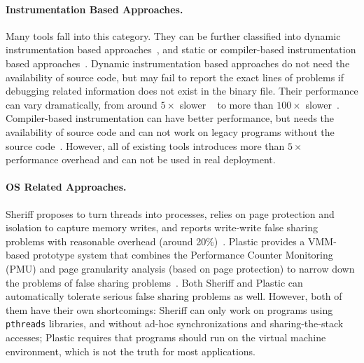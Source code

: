 \paragraph{Instrumentation Based Approaches.} Many tools fall into this category. They can be further classified into dynamic instrumentation based approaches~\cite{falseshare:binaryinstrumentation1, falseshare:binaryinstrumentation2, qinzhao}, and static or compiler-based instrumentation based approaches~\cite{Predator}. Dynamic instrumentation based approaches do not need the availability of source code, but may fail to report the exact lines of problems if debugging related information does not exist in the binary file. Their performance can vary dramatically, from around $5\times$ slower ~\cite{qinzhao} to more than $100\times$ slower~\cite{falseshare:binaryinstrumentation1, falseshare:binaryinstrumentation2}. Compiler-based instrumentation can have better performance,  but needs the availability of source code and can not work on legacy programs without the source code~\cite{Predator}. However, all of existing tools introduces more than $5\times$ performance overhead and can not be used in real deployment. 

\paragraph{OS Related Approaches.} Sheriff proposes to turn threads into processes, relies on page protection and isolation to capture memory writes, and reports write-write false sharing problems with reasonable overhead (around 20\%)~\cite{Sheriff}. Plastic provides a VMM-based prototype system that combines the Performance Counter Monitoring (PMU) and page granularity analysis (based on page protection) to narrow down the problems of false sharing problems~\cite{OSdetection}. Both Sheriff and Plastic can automatically tolerate serious false sharing problems as well. However, both of them have their own shortcomings: Sheriff can only work on programs using \texttt{pthreads} libraries, and without ad-hoc synchronizations and sharing-the-stack accesses; Plastic requires that programs should run on the virtual machine environment, which is not the truth for most applications.   

